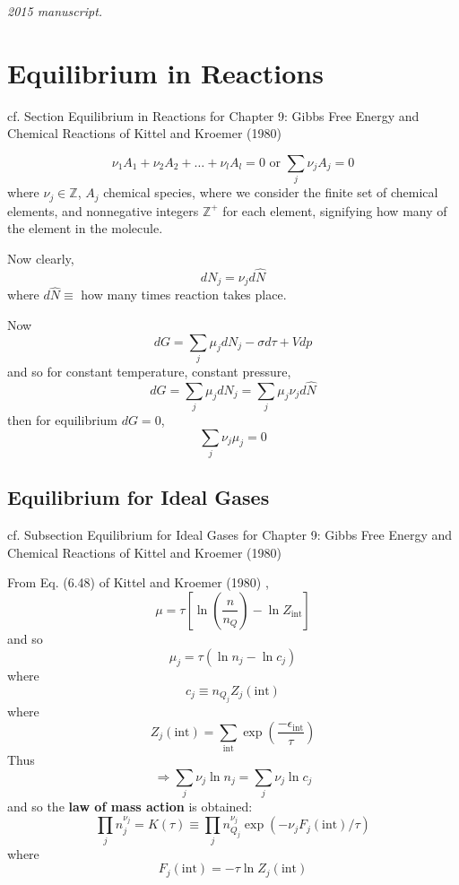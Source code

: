 \noindent\textit{2015 manuscript.}

\section{Equilibrium in Reactions}
\label{sec:reaction-equilibrium}

cf. Section Equilibrium in Reactions for Chapter 9: Gibbs Free Energy and Chemical Reactions of Kittel and Kroemer (1980) \cite{CKittelHKroemer1980}

\begin{equation}
  \nu_1 A_1 + \nu_2 A_2 + \dots + \nu_l A_l = 0 \text{ or } \sum_j \nu_j A_j = 0
\end{equation}
where $\nu_j \in \mathbb{Z}$, $A_j$ chemical species, where we consider the finite set of chemical elements, and nonnegative integers $\mathbb{Z}^+$ for each element, signifying how many of the element in the molecule.  

Now clearly,
\[
dN_j = \nu_j d\widehat{N}
\]
where $d\widehat{N} \equiv$ how many times reaction takes place.

Now
\[
dG = \sum_j \mu_j dN_j - \sigma d\tau + Vdp
\]
and so for constant temperature, constant pressure, 
\[
dG = \sum_j \mu_j dN_j = \sum_j \mu_j \nu_j d\widehat{N} 
\]
then for equilibrium $dG=0$, 
\begin{equation}
\boxed{ \sum_j \nu_j \mu_j = 0 }
\end{equation}


\subsection{Equilibrium for Ideal Gases}

cf. Subsection Equilibrium for Ideal Gases for Chapter 9: Gibbs Free Energy and Chemical Reactions of Kittel and Kroemer (1980) \cite{CKittelHKroemer1980}

From Eq. (6.48) of Kittel and Kroemer (1980) \cite{CKittelHKroemer1980}, 
\[
\mu = \tau [ \ln{ \left( \frac{n}{n_Q} \right)} - \ln{ Z_{\text{int}} } ]
\]
and so
\[
\mu_j = \tau (\ln{ n_j} - \ln{c_j})
\]
where 
\[
c_j \equiv n_{Q_j} Z_j(\text{int})
\]
where
\[
Z_j(\text{int}) = \sum_{\text{int}} \exp{ \left( \frac{-\epsilon_{\text{int}} }{\tau} \right) }
\]
Thus
\[
\Longrightarrow \sum_j \nu_j \ln{n_j} = \sum_j \nu_j \ln{c_j}
\]
and so the \textbf{law of mass action} is obtained:
\begin{equation}
  \boxed{ \prod_j n_j^{\nu_j} = K(\tau) \equiv \prod_j n_{Q_j}^{\nu_j} \exp{ \left( -\nu_j F_j(\text{int})/ \tau \right) }  }
\end{equation}
where
\[
F_j(\text{int}) = -\tau \ln{Z_j(\text{int}) }
\]

